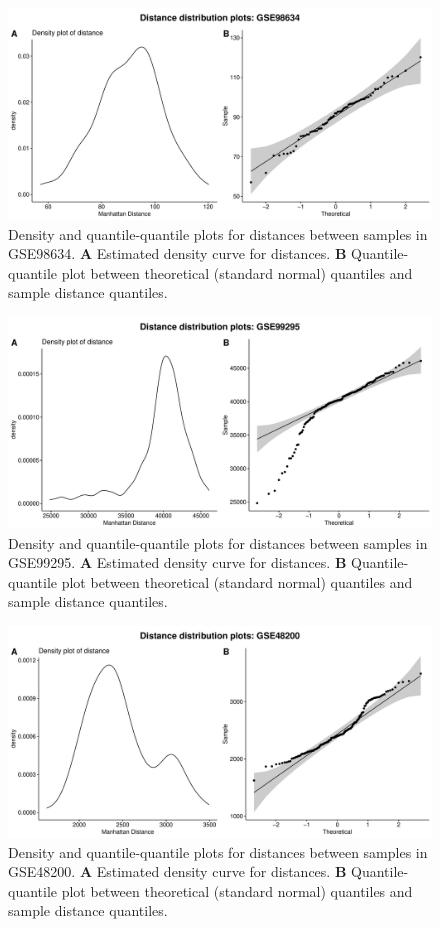 \documentclass[10pt,letterpaper]{article}\usepackage[]{graphicx}\usepackage[]{color}
\begin{document}
\begin{figure}[H]
	\includegraphics[width=\textwidth]{manhattan-distance_hist_GSE98634.pdf}
	\caption{Density and quantile-quantile plots for distances between samples in GSE98634. \textbf{A} Estimated density curve for distances. \textbf{B} Quantile-quantile plot between theoretical (standard normal) quantiles and sample distance quantiles.}
\end{figure}

\begin{figure}[H]
	\includegraphics[width=\textwidth]{manhattan-distance_hist_GSE99295.pdf}
	\caption{Density and quantile-quantile plots for distances between samples in GSE99295. \textbf{A} Estimated density curve for distances. \textbf{B} Quantile-quantile plot between theoretical (standard normal) quantiles and sample distance quantiles.}
\end{figure}

\begin{figure}[H]
	\includegraphics[width=\textwidth]{manhattan-distance_hist_GSE48200.pdf}
	\caption{Density and quantile-quantile plots for distances between samples in GSE48200. \textbf{A} Estimated density curve for distances. \textbf{B} Quantile-quantile plot between theoretical (standard normal) quantiles and sample distance quantiles.}
\end{figure}
\end{document}
